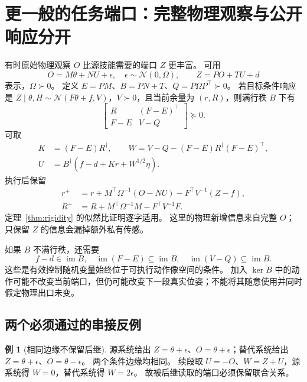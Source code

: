 \documentclass[UTF8,fontset=fandol,11pt,a4paper]{ctexart}
\newcommand{\N}{\mathcal N}
\newcommand{\im}{\operatorname{im}}
\theoremstyle{definition}
\newtheorem{example}[theorem]{例}
\theoremstyle{remark}
\numberwithin{equation}{section}
\begin{document}
\section{更一般的任务端口：完整物理观察与公开响应分开}
\label{sec:port}

有时原始物理观察 $O$ 比源技能需要的端口 $Z$ 更丰富。
可用
\begin{equation}
 O=M\theta+NU+\epsilon,\quad\epsilon\sim\N(0,\Omega),\qquad
 Z=PO+TU+d
 \label{eq:portmodel}
\end{equation}
表示，$\Omega\succ0$。
定义 $E=PM$、$B=PN+T$、$Q=P\Omega P^\top\succ0$。
若目标条件响应是
$Z\mid\theta,H\sim\N(F\theta+f,V)$，$V\succ0$，且当前余量为 $(r,R)$，则满行秩 $B$ 下有
\begin{equation}
 \begin{bmatrix}R&(F-E)^\top\\F-E&V-Q\end{bmatrix}\succeq0.
 \label{eq:portgate}
\end{equation}
可取
\begin{align}
 K&=(F-E)R^\dagger,\qquad
 W=V-Q-(F-E)R^\dagger(F-E)^\top,\\
 U&=B^\dagger(f-d+Kr+W^{1/2}\eta).
\end{align}
执行后保留
\begin{align}
 r^+&=r+M^\top\Omega^{-1}(O-NU)-F^\top V^{-1}(Z-f),\label{eq:generalresidual}\\
 R^+&=R+M^\top\Omega^{-1}M-F^\top V^{-1}F.\label{eq:generalprecision}
\end{align}
定理~\ref{thm:rigidity} 的似然比证明逐字适用。
这里的物理新增信息来自完整 $O$；只保留 $Z$ 的信息会漏掉额外私有传感。

如果 $B$ 不满行秩，还需要
\begin{equation}
 f-d\in\im B,\quad\im(F-E)\subseteq\im B,\quad\im(V-Q)\subseteq\im B.
\end{equation}
这些是有效控制随机变量始终位于可执行动作像空间的条件。
加入 $\ker B$ 中的动作可能不改变当前端口，但仍可能改变下一段真实位姿；不能将其随意使用并同时假定物理出口未变。

\subsection{两个必须通过的串接反例}
\begin{example}[相同边缘不保留后继]
源系统给出 $Z=\theta+\epsilon$、$O=\theta+\epsilon$；替代系统给出 $Z=\theta+\epsilon$、$O=\theta-\epsilon$。
两个条件边缘均相同。
续段取 $U=-O$、$W=Z+U$，源系统得 $W=0$，替代系统得 $W=2\epsilon$。
故被后继读取的端口必须保留联合关系。
\end{example}
\end{document}
